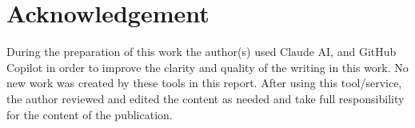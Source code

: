 \section{Acknowledgement}\label{sec:acknowledgement}

During the preparation of this work the author(s) used Claude AI, and GitHub Copilot in order to improve the clarity and quality of the writing in this work.
No new work was created by these tools in this report.
After using this tool/service, the author reviewed and edited the content as needed and take full responsibility for the content of the publication.
